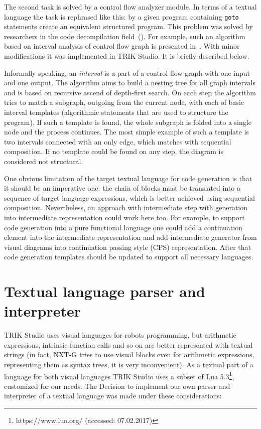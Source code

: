 \documentclass[conference]{IEEEtran}
\begin{document}
The second task is solved by a control flow analyzer module. In terms of a textual language the task is rephrased like this: by a given program containing \texttt{goto} statements create an equivalent structured program. This problem was solved by researchers in the code decompilation field~(\cite{steven1997advanced,деревенец2009структурный}). For example, such an algorithm based on interval analysis of control flow graph is presented in~\cite{steven1997advanced}. With minor modifications it was implemented in TRIK Studio. It is briefly described below.

Informally speaking, an \textit{interval} is a part of a control flow graph with one input and one output. The algorithm aims to build a nesting tree for all graph intervals and is based on recursive ascend of depth-first search. On each step the algorithm tries to match a subgraph, outgoing from the current node, with each of basic interval templates (algorithmic statements that are used to structure the program). If such a template is found, the whole subgraph is folded into a single node and the process continues. The most simple example of such a template is two intervals connected with an only edge, which matches with sequential composition. If no template could be found on any step, the diagram is considered not structural. 

One obvious limitation of the target textual language for code generation is that it should be an imperative one: the chain of blocks must be translated into a sequence of target language expressions, which is better achieved using sequential composition. Nevertheless, an approach with intermediate step with generation into intermediate representation could work here too. For example, to support code generation into a pure functional language one could add a continuation element into the intermediate representation and add intermediate generator from visual diagrams into continuation passing style (CPS) representation. After that code generation templates should be updated to support all necessary languages.
 
\section{Textual language parser and interpreter}
\label{chapter:parser}
TRIK Studio uses visual languages for robots programming, but arithmetic expressions, intrinsic function calls and so on are better represented with textual strings (in fact, NXT-G tries to use visual blocks even for arithmetic expressions, representing them as syntax trees, it is very inconvenient). As a textual part of a language for both visual languages TRIK Studio uses a subset of Lua 5.3\footnote{https://www.lua.org/ (accessed: 07.02.2017)}, customized for our needs. The Decision to implement our own parser and interpreter of a textual language was made under these considerations:
\end{document}
